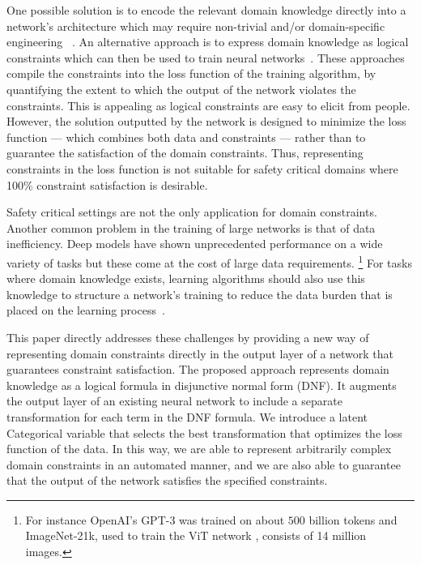 \documentclass[letterpaper]{article} %
\begin{document}
One possible solution is to encode the relevant domain knowledge directly into a network's architecture which may require non-trivial and/or domain-specific engineering  ~\citep{goodfellow2016deep}.
An alternative approach is to express domain knowledge as logical constraints which can then be used to train neural networks~\citep{xu2017semantic,fischer2018dl2,allen2020probabilistic}.
These approaches compile the constraints into the loss function of the training algorithm, by quantifying the extent to which the output of the network violates the constraints.
This is appealing as logical constraints are easy to elicit from people.
However, the solution outputted by the network is designed to minimize the loss function --- which combines both data and constraints --- rather than to guarantee the satisfaction of the domain constraints.
Thus, representing constraints in the loss function is not suitable for safety critical domains where 100\% constraint satisfaction is desirable.

Safety critical settings are not the only application for domain constraints.
Another common problem in the training of large networks is that of data inefficiency.
Deep models have shown unprecedented performance on a wide variety of tasks but these come at the cost of large data requirements.%
    \footnote{For instance OpenAI's GPT-3 \citep{brown2020language} was trained on about $500$ billion tokens and ImageNet-21k, used to train the ViT network \citep{dosovitskiy2020image}, consists of 14 million images.}
For tasks where domain knowledge exists, learning algorithms should also use this knowledge to structure a network's training to reduce the data burden that is placed on the learning process~\citep{fischer2018dl2}.

This paper directly addresses these challenges by providing a new way of representing domain constraints directly in the output layer of a network that guarantees constraint satisfaction.
The proposed approach represents domain knowledge as a logical formula in disjunctive normal form (DNF).
It augments the output layer of an existing neural network to include a separate transformation for each term in the DNF formula.
We introduce a latent Categorical variable that selects the best transformation that optimizes the loss function of the data.
In this way, we are able to represent arbitrarily complex domain constraints in an automated manner, and we are also able to guarantee that the output of the network satisfies the specified constraints.
\end{document}
